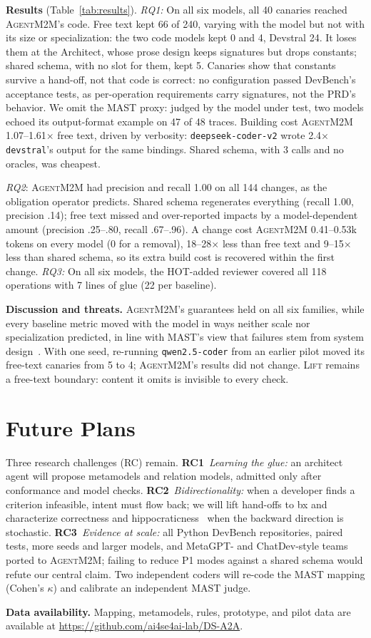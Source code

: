 \documentclass[10pt,conference]{IEEEtran}
\theoremstyle{definition}
\newcommand{\tool}{\textsc{AgentM2M}}
\newcommand{\RC}[1]{\textbf{RC#1}}
\begin{document}
\smallskip\noindent\textbf{Results} (Table~\ref{tab:results}).
\emph{RQ1:} On all six models, all 40 canaries reached \tool{}'s code.
Free text kept 66 of 240, varying with the model but not with its size or
specialization: the two code models kept 0 and 4, Devstral 24. It loses
them at the Architect, whose prose design keeps signatures but drops
constants; shared schema, with no slot for them, kept 5. Canaries show that
constants survive a hand-off, not that code is correct: no configuration
passed DevBench's acceptance tests, as per-operation requirements carry
signatures, not the PRD's behavior. We omit the MAST proxy: judged by the
model under test, two models echoed its output-format example on 47 of 48
traces. Building cost \tool{} 1.07--1.61$\times$ free text, driven by verbosity:
\texttt{deepseek-coder-v2} wrote 2.4$\times$ \texttt{devstral}'s output for
the same bindings. Shared schema, with 3 calls and no oracles, was cheapest.

\emph{RQ2}: \tool{} had precision and recall 1.00
on all 144 changes, as the obligation operator predicts. Shared schema
regenerates everything (recall 1.00, precision .14); free text missed and
over-reported impacts by a model-dependent amount (precision .25--.80,
recall .67--.96). A change cost \tool{} 0.41--0.53k tokens on every model
(0 for a removal), 18--28$\times$ less than free text and 9--15$\times$
less than shared schema, so its extra build cost is recovered within the
first change. \emph{RQ3:} On all six models, the HOT-added reviewer covered
all 118 operations with 7 lines of glue (22 per baseline).

\smallskip\noindent\textbf{Discussion and threats.} \tool{}'s guarantees
held on all six families, while every baseline metric moved with the model
in ways neither scale nor specialization predicted, in line with MAST's
view that failures stem from system design~\cite{cemri2025mast}. With one
seed, re-running \texttt{qwen2.5-coder} from an earlier pilot moved its
free-text canaries from 5 to 4; \tool{}'s results did not change.  \textsc{Lift} remains a free-text boundary: content it omits is
invisible to every check.

\section{Future Plans}\label{sec:future}

Three research challenges (RC) remain. \RC{1}~\emph{Learning the glue:}
an architect agent will propose metamodels and relation models, admitted
only after conformance and model checks. \RC{2}~\emph{Bidirectionality:}
when a developer finds a criterion infeasible, intent must flow back; we
will lift hand-offs to bx and characterize
correctness and hippocraticness~\cite{stevens2010qvt} when the backward
direction is stochastic. \RC{3}~\emph{Evidence at scale:} all Python
DevBench repositories, paired tests, more seeds and larger models,
and MetaGPT- and ChatDev-style
teams~\cite{hong2024metagpt,qian2024chatdev} ported to \tool{}; failing to
reduce P1 modes against a shared schema would refute our central claim.
Two independent coders will re-code the MAST mapping (Cohen's $\kappa$)
and calibrate an independent MAST judge.

\smallskip\noindent\textbf{Data availability.}\label{sec:data} Mapping, metamodels, rules,
prototype, and pilot data are available at \url{https://github.com/ai4se4ai-lab/DS-A2A}.



\end{document}

